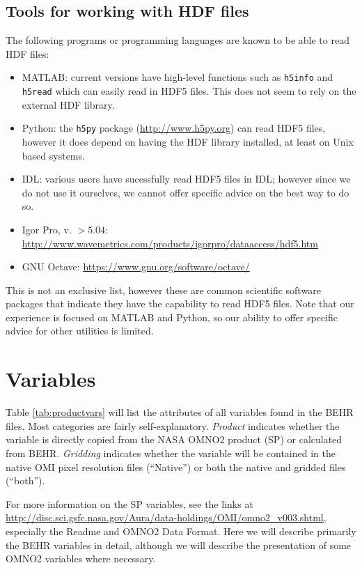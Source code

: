 \documentclass[12pt]{article}
\begin{document}
	\subsection{Tools for working with HDF files}
	The following programs or programming languages are known to be able to read HDF files:
	\begin{itemize}
		\item MATLAB: current versions have high-level functions such as \texttt{h5info} and \texttt{h5read} which can easily read in HDF5 files. This does not seem to rely on the external HDF library.
		\item Python: the \texttt{h5py} package (\url{http://www.h5py.org}) can read HDF5 files, however it does depend on having the HDF library installed, at least on Unix based systems. 
		\item IDL: various users have sucessfully read HDF5 files in IDL; however since we do not use it ourselves, we cannot offer specific advice on the best way to do so. 
		\item Igor Pro, v. $>5.04$: \url{http://www.wavemetrics.com/products/igorpro/dataaccess/hdf5.htm}
		\item GNU Octave: \url{https://www.gnu.org/software/octave/}
	\end{itemize}
	
	This is not an exclusive list, however these are common scientific software packages that indicate they have the capability to read HDF5 files. Note that our experience is focused on MATLAB and Python, so our ability to offer specific advice for other utilities is limited.
	
	
\section{Variables}
	Table \ref{tab:productvars} will list the attributes of all variables found in the BEHR files. Most categories are fairly self-explanatory. \emph{Product} indicates whether the variable is directly copied from the NASA OMNO2 product (SP) or calculated from BEHR. \emph{Gridding} indicates whether the variable will be contained in the native OMI pixel resolution files (``Native'') or both the native and gridded files (``both'').
	
	For more information on the SP variables, see the links at \url{http://disc.sci.gsfc.nasa.gov/Aura/data-holdings/OMI/omno2_v003.shtml}, especially the Readme and OMNO2 Data Format.  Here we will describe primarily the BEHR variables in detail, although we will describe the presentation of some OMNO2 variables where necessary.
	
\end{document}
